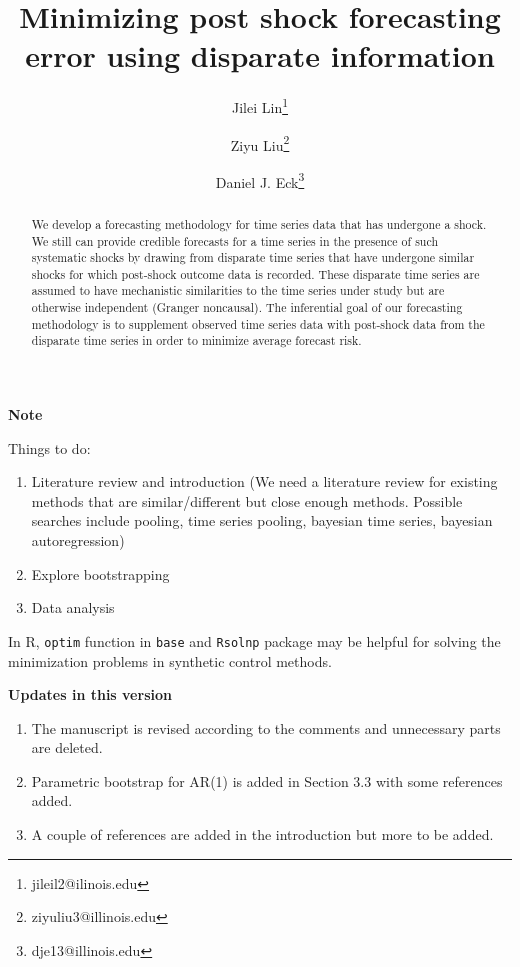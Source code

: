 \documentclass[11pt]{article}
\title{Minimizing post shock forecasting error using disparate information}
\author{Jilei Lin\thanks{jileil2@ilinois.edu}}
\author{Ziyu Liu\thanks{ziyuliu3@illinois.edu}}
\author{Daniel J. Eck\thanks{dje13@illinois.edu}}
\affil{Department of Statistics, University of Illinois at Urbana-Champaign}
\theoremstyle{definition}
\begin{document}
\begin{center}
  \textbf{Note}
\end{center}


Things to do:
\begin{enumerate}
  \item Literature review and introduction (We need a literature review for existing methods that are similar/different but close enough methods.  Possible searches include pooling, time series pooling, bayesian time series, bayesian autoregression)
  \item Explore bootstrapping
  \item Data analysis
\end{enumerate}

In R, \texttt{optim} function in \texttt{base} and \texttt{Rsolnp} package may be helpful for solving the minimization problems in synthetic control methods.


\begin{center}
  \textbf{Updates in this version}
\end{center}

\begin{enumerate}
  \item The manuscript is revised according to the comments and unnecessary parts are deleted.
  \item Parametric bootstrap for AR(1) is added in Section  3.3 with some references added.
  \item A couple of references are added in the introduction but more to be added.
\end{enumerate}


\tableofcontents


\newpage 

\maketitle
\begin{abstract}
    We develop a forecasting methodology for time series data that has 
    undergone a shock. We still can provide credible forecasts for a time 
    series in the presence of such systematic shocks by drawing from disparate 
    time series that have undergone similar shocks for which post-shock 
    outcome data is recorded.  These disparate time series are assumed to have 
    mechanistic similarities to the time series under study but are otherwise 
    independent (Granger noncausal).  The inferential goal of our forecasting 
    methodology is to supplement observed time series data with post-shock 
    data from the disparate time series in order to minimize average forecast 
    risk. 
\end{abstract}
\end{document}
